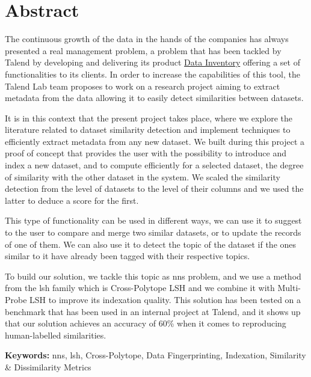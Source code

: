 \chapter*{Abstract}

The continuous growth of the data in the hands of the companies has always
presented a real management problem, a problem that has been tackled by Talend
by developing and delivering its product
\href{https://www.talend.com/products/data-inventory/}{Data Inventory} offering
a set of functionalities to its clients. In order to increase the capabilities
of this tool, the Talend Lab team proposes to work on a research project aiming
to extract metadata from the data allowing it to easily detect similarities
between datasets. 

It is in this context that the present project takes place, where we explore the
literature related to dataset similarity detection and implement techniques to
efficiently extract metadata from any new dataset. We built during this project
a proof of concept that provides the user with the possibility to introduce and
index a new dataset, and to compute efficiently for a selected dataset, the
degree of similarity with the other dataset in the system. We scaled the
similarity detection from the level of datasets to the level of their columns
and we used the latter to deduce a score for the first.

This type of functionality can be used in different ways, we can use it to
suggest to the user to compare and merge two similar datasets, or to update the
records of one of them. We can also use it to detect the topic of the dataset if
the ones similar to it have already been tagged with their respective topics.

To build our solution, we tackle this topic as \acrfull{nns} problem, and we use
a method from the \acrfull{lsh} family which is Cross-Polytope LSH and we
combine it with Multi-Probe LSH to improve its indexation quality. This solution
has been tested on a benchmark that has been used in an internal project at
Talend, and it shows up that our solution achieves an accuracy of 60\% when it
comes to reproducing human-labelled similarities.

\vspace{2cm}
\textbf{Keywords:}
\acrlong{nns}, \acrlong{lsh}, Cross-Polytope, Data Fingerprinting, Indexation,
Similarity \& Dissimilarity Metrics